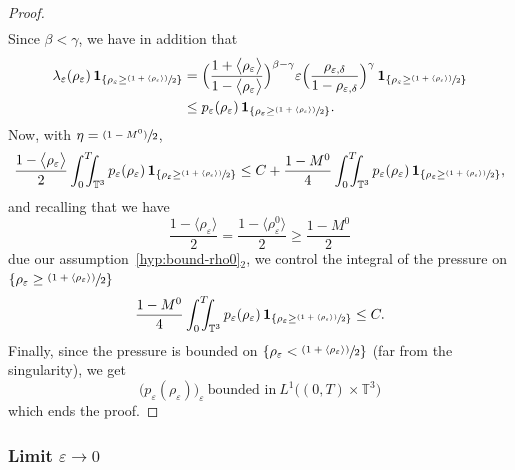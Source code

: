 \documentclass[10pt]{amsart}
\newcommand{\<}{\bigl\langle}
\renewcommand{\>}{\bigr\rangle}
\newcommand{\psfrac}[2]{\sfrac{(#1)}{#2}}
\newcommand{\intTTT}{\int_0^T\hspace*{-2.5mm}\int_{\TT}}
\newcommand{\labeleq}[1]{}
\theoremstyle{definition}
\theoremstyle{remark}
\newcommand{\TT}{\mathbb{T}^3}
\let\ep\varepsilon
\begin{document}
\begin{proof}
\begin{align*}
\end{align*}
Since $\beta < \gamma$, we have in addition that
\begin{align*}
\lambda_{\ep}(\rho_{\ep}) \,\mathbf{1}_{\{ \rho_{\ep} \geq \psfrac{1+\langle\rho_{\ep}\rangle}{2}\} }
& = \Bigl(\dfrac{1+\<\rho_{\ep}\>}{1-\<\rho_{\ep}\>}\Bigr)^{\beta-\gamma}\ep \Bigl(\dfrac{\rho_{\ep,\delta}}{1-\rho_{\ep,\delta}}\Bigr)^{\gamma} \,\mathbf{1}_{\{ \rho_{\ep} \geq \psfrac{1+\langle\rho_{\ep}\rangle}{2}\}} \\
& \leq p_{\ep}(\rho_{\ep}) \,\mathbf{1}_{\{ \rho_{\ep} \geq \psfrac{1+\langle\rho_{\ep}\rangle}{2}\} }.
\end{align*}
Now, with $\eta = \psfrac{1-M^0}{2}$,
\[
\dfrac{1-\<\rho_{\ep}\>}{2} \intTTT{p_{\ep}(\rho_{\ep})\,\mathbf{1}_{\{ \rho_{\ep} \geq \psfrac{1+\langle\rho_{\ep}\rangle}{2} \} } }\leq C + \dfrac{1-M^0}{4} \intTTT{p_{\ep}(\rho_{\ep}) \,\mathbf{1}_{\{ \rho_{\ep} \geq \psfrac{1+\langle\rho_{\ep}\rangle}{2}\} } },
\]
and recalling that we have
\[
\dfrac{1-\<\rho_{\ep}\>}{2} = \dfrac{1-\<\rho_{\ep}^0\>}{2} \geq \dfrac{1-M^0}{2}
\]
due our assumption~\eqref{hyp:bound-rho0}${}_2$,
we control the integral of the pressure on $\{ \rho_{\ep} \geq \psfrac{1+\langle\rho_{\ep}\rangle}{2}\}$
\[
\dfrac{1-M^0}{4}
\intTTT{p_{\ep}(\rho_{\ep})\,\mathbf{1}_{\{ \rho_{\ep} \geq \psfrac{1+\langle\rho_{\ep}\rangle}{2} \} } } \leq C.
\]
Finally, since the pressure is bounded on $\{ \rho_{\ep} < \psfrac{1+\langle\rho_{\ep}\rangle}{2}\}$ (far from the singularity), we get
\begin{equation*}\labeleq{bound-pep-L1}
\big(p_{\ep}(\rho_{\ep})\big)_\ep~ \text{bounded in} ~L^1\big((0,T)\times \TT \big)
\end{equation*}
which ends the proof.
\end{proof} 

\subsubsection{Limit $\ep\rightarrow 0$}
\end{document}
